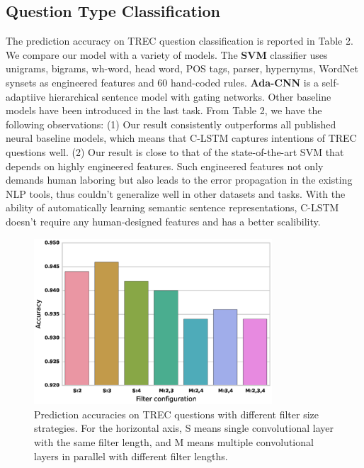 \documentclass[11pt,letterpaper]{article}
\begin{document}
\subsection{Question Type Classification}
The prediction accuracy on TREC question classification is reported in
Table 2. We compare our model with a variety of models. The {\bf SVM}
classifier uses unigrams, bigrams, wh-word, head word, POS tags,
parser, hypernyms, WordNet synsets as engineered features and 60
hand-coded rules. {\bf Ada-CNN} is a self-adaptiive hierarchical sentence
model with gating networks. Other baseline models have been introduced
in the last task. From Table 2, we have the following observations:
(1) Our result consistently outperforms all published neural baseline models, which means that C-LSTM
captures intentions of TREC questions well.
(2) Our result is close to that of the state-of-the-art SVM that depends on highly engineered features. Such engineered features not only demands human laboring but also leads to the error propagation in the existing NLP tools, thus couldn't generalize well in other datasets and tasks. With the ability of automatically learning semantic sentence representations, C-LSTM doesn't require any human-designed features and has a better scalibility.

\begin{figure}[th]
\centering
\includegraphics[width=3.5in]{comp.eps}
\caption{Prediction accuracies on TREC questions with different filter
size strategies. For the horizontal axis, S means single convolutional
layer with the same filter length, and M means multiple convolutional
layers in parallel with different filter lengths.}
\end{figure}
\end{document}
